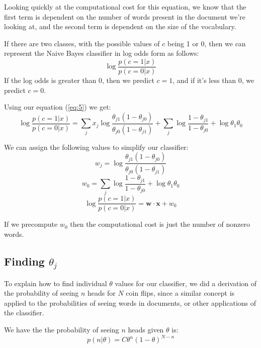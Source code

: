 Looking quickly at the computational cost for this equation, we know that the first term is dependent on the number of words present in the document we're looking at, and the second term is dependent on the size of the vocabulary.

If there are two classes, with the possible values of $c$ being 1 or 0, then we can represent the Naive Bayes classifier in log odds form as follows:
\begin{equation}
\log\frac{p(c=1|x)}{p(c=0|x)}
\end{equation}
If the log odds is greater than 0, then we predict $c = 1$, and if it's less than 0, we predict $c = 0$.

Using our equation (\ref{eq:5}) we get:
\begin{equation}
\log\frac{p(c=1|x)}{p(c=0|x)} = \sum_j x_j \log\frac{\theta_{j1}(1-\theta_{j0})}{\theta_{j0}(1-\theta_{j1})} + \sum_j \log\frac{1-\theta_{j1}}{1-\theta_{j0}} + \log{\theta_1}{\theta_0}
\end{equation}

We can assign the following values to simplify our classifier:
\begin{equation}
w_j = \log\frac{\theta_{j1}(1-\theta_{j0})}{\theta_{j0}(1-\theta_{j1})}
\end{equation}
\begin{equation}
w_0 = \sum_j \log\frac{1-\theta_{j1}}{1-\theta_{j0}} + \log{\theta_1}{\theta_0}
\end{equation}
\begin{equation}
\log\frac{p(c=1|x)}{p(c=0|x)} = \mathbf{w} \cdot \mathbf{x} + w_0
\end{equation}

If we precompute $w_0$ then the computational cost is just the number of nonzero words.

\subsection{Finding \texorpdfstring{$\theta_j$}{Thetas}}
To explain how to find individual $\theta$ values for our classifier, we did a derivation of the probability of seeing $n$ heads for $N$ coin flips, since a similar concept is applied to the probabilities of seeing words in documents, or other applications of the classifier.

We have the the probability of seeing $n$ heads given $\theta$ is:
\begin{equation}
p(n|\theta) = C \theta^n (1-\theta)^{N-n}
\end{equation}

